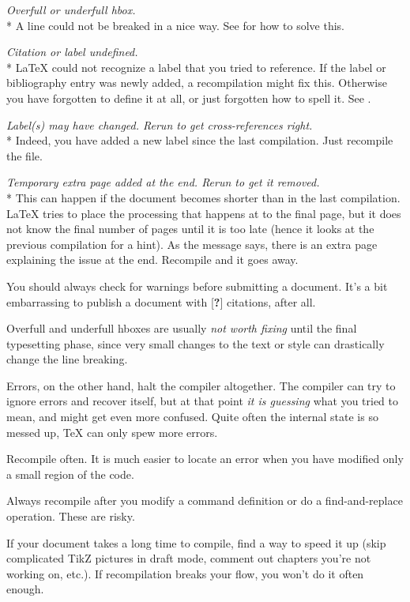 \medskip\noindent\emph{Overfull or underfull hbox.}\\*
A line could not be breaked in a nice way.
See  for how to solve this.

\medskip\noindent\emph{Citation or label undefined.}\\*
\LaTeX{} could not recognize a label that you tried to reference.
If the label or bibliography entry was newly added, a recompilation might fix this.
Otherwise you have forgotten to define it at all, or just forgotten how to spell it.
See .

\medskip\noindent\emph{Label(s) may have changed. Rerun to get cross-references right.}\\*
Indeed, you have added a new label since the last compilation.
Just recompile the file.

\medskip\noindent\emph{Temporary extra page added at the end. Rerun to get it removed.}\\*
This can happen if the document becomes shorter than in the last compilation.
\LaTeX{} tries to place the processing that happens at \verb||
to the final page, but it does not know the final number of pages until it is too late
(hence it looks at the previous compilation for a hint).
As the message says, there is an extra page explaining the issue at the end.
Recompile and it goes away.


\begin{practices}
You should always check for warnings before submitting a document.
It's a bit embarrassing to publish a document with [\textbf{?}] citations, after all.

Overfull and underfull hboxes are usually \emph{not worth fixing}
until the final typesetting phase,
since very small changes to the text or style can drastically change the line breaking.
\end{practices}


Errors, on the other hand, halt the compiler altogether.
The compiler can try to ignore errors and recover itself,
but at that point \emph{it is guessing} what you tried to mean,
and might get even more confused.
Quite often the internal state is so messed up, \TeX{} can only spew more errors.


\begin{practices}
Recompile often.
It is much easier to locate an error when you have modified only a small region of the code.

Always recompile after you modify a command definition
or do a find-and-replace operation.
These are risky.

If your document takes a long time to compile,
find a way to speed it up
(skip complicated TikZ pictures in draft mode, comment out chapters you're not working on, etc.).
If recompilation breaks your flow, you won't do it often enough.

\end{practices}


